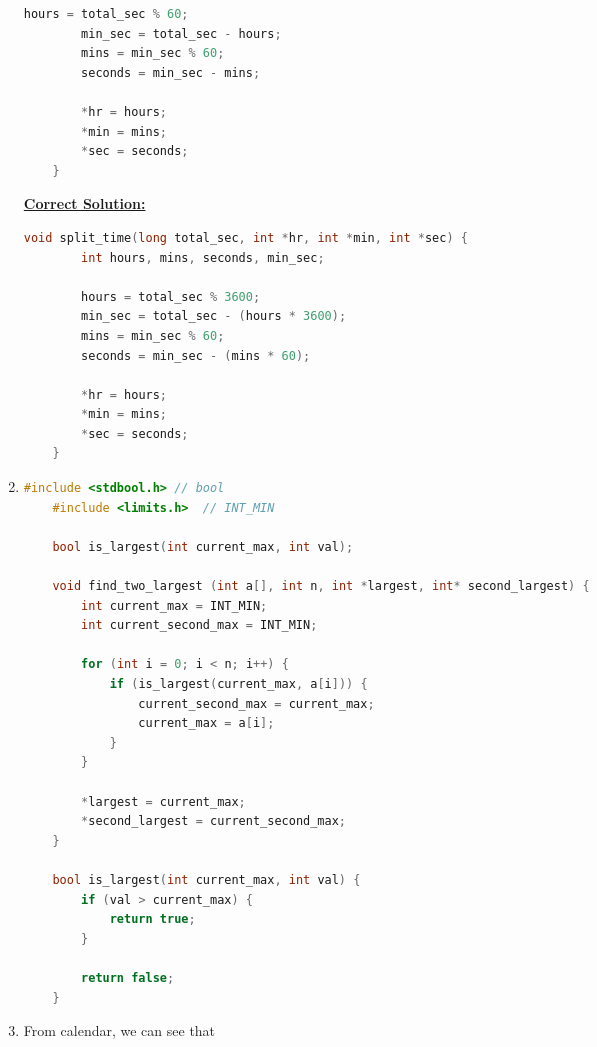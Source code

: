 \documentclass[12pt]{article}
\begin{document}
\begin{enumerate}[1.]
\begin{lstlisting}[language=c]
        hours = total_sec % 60;
        min_sec = total_sec - hours;
        mins = min_sec % 60;
        seconds = min_sec - mins;

        *hr = hours;
        *min = mins;
        *sec = seconds;
    }
\end{lstlisting}

    \bigskip

    \begin{mdframed}
    \underline{\textbf{Correct Solution:}}

    \bigskip

\begin{lstlisting}[language=c]
    void split_time(long total_sec, int *hr, int *min, int *sec) {
        int hours, mins, seconds, min_sec;

        hours = total_sec % 3600;
        min_sec = total_sec - (hours * 3600);
        mins = min_sec % 60;
        seconds = min_sec - (mins * 60);

        *hr = hours;
        *min = mins;
        *sec = seconds;
    }
\end{lstlisting}
    \end{mdframed}

    \item

\begin{lstlisting}[language=c]
    #include <stdbool.h> // bool
    #include <limits.h>  // INT_MIN

    bool is_largest(int current_max, int val);

    void find_two_largest (int a[], int n, int *largest, int* second_largest) {
        int current_max = INT_MIN;
        int current_second_max = INT_MIN;

        for (int i = 0; i < n; i++) {
            if (is_largest(current_max, a[i])) {
                current_second_max = current_max;
                current_max = a[i];
            }
        }

        *largest = current_max;
        *second_largest = current_second_max;
    }

    bool is_largest(int current_max, int val) {
        if (val > current_max) {
            return true;
        }

        return false;
    }
\end{lstlisting}

    \item

    From calendar, we can see that


\end{enumerate}
\end{document}
